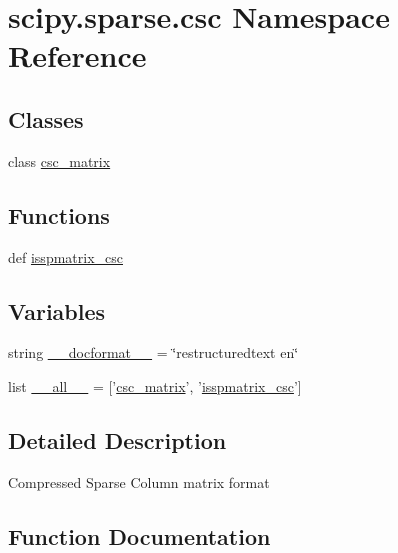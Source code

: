 \hypertarget{namespacescipy_1_1sparse_1_1csc}{}\section{scipy.\+sparse.\+csc Namespace Reference}
\label{namespacescipy_1_1sparse_1_1csc}
\subsection*{Classes}
\begin{DoxyCompactItemize}
\item 
class \hyperlink{classscipy_1_1sparse_1_1csc_1_1csc__matrix}{csc\+\_\+matrix}
\end{DoxyCompactItemize}
\subsection*{Functions}
\begin{DoxyCompactItemize}
\item 
def \hyperlink{namespacescipy_1_1sparse_1_1csc_a4f10d634e34386c4ef0c2fb8707ac951}{isspmatrix\+\_\+csc}
\end{DoxyCompactItemize}
\subsection*{Variables}
\begin{DoxyCompactItemize}
\item 
string \hyperlink{namespacescipy_1_1sparse_1_1csc_a5f5af233a9716e199965e48934646a78}{\+\_\+\+\_\+docformat\+\_\+\+\_\+} = \char`\"{}restructuredtext en\char`\"{}
\item 
list \hyperlink{namespacescipy_1_1sparse_1_1csc_aa268581ffec2371f5dd6f46f7d2a8a21}{\+\_\+\+\_\+all\+\_\+\+\_\+} = \mbox{[}'\hyperlink{classscipy_1_1sparse_1_1csc_1_1csc__matrix}{csc\+\_\+matrix}', '\hyperlink{namespacescipy_1_1sparse_1_1csc_a4f10d634e34386c4ef0c2fb8707ac951}{isspmatrix\+\_\+csc}'\mbox{]}
\end{DoxyCompactItemize}


\subsection{Detailed Description}
\begin{DoxyVerb}Compressed Sparse Column matrix format\end{DoxyVerb}
 

\subsection{Function Documentation}
\hypertarget{namespacescipy_1_1sparse_1_1csc_a4f10d634e34386c4ef0c2fb8707ac951}{}
